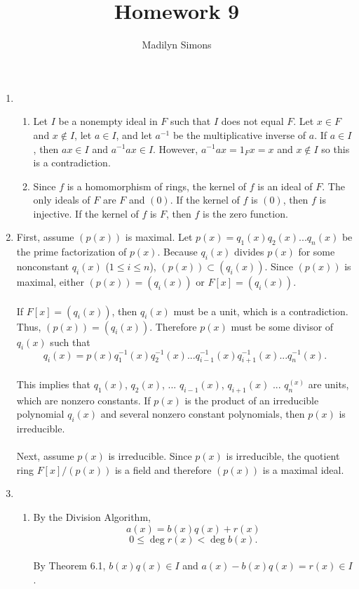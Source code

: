 \documentclass{article}
\title{Homework 9}
\author{Madilyn Simons}
\date{}
\begin{document}
\maketitle

\begin{enumerate}

\item
\begin{enumerate}

\item Let $I$ be a nonempty ideal in $F$ such that $I$ does not equal $F$.
Let $x \in F$ and $x \notin I$, let $a \in I$, and let $a^{-1}$ be the
multiplicative inverse of $a$.  If $a \in I$, then $ax \in I$ and
$a^{-1}ax \in I$.  However, $a^{-1}ax = 1_{F}x = x$ and $x \notin I$ so this
is a contradiction.

\item Since $f$ is a homomorphism of rings, the kernel of $f$ is an ideal
of $F$.  The only ideals of $F$ are $F$ and $(0)$.  If the kernel of
$f$ is $(0)$, then $f$ is injective.  If the kernel of $f$ is $F$, then
$f$ is the zero function.

\end{enumerate}

\item
First, assume $(p(x))$ is maximal.  Let
$p(x) = q_{1}(x)q_{2}(x) ... q_{n}(x)$ be the prime factorization of $p(x)$.
Because $q_{i}(x)$ divides $p(x)$ for some nonconstant $q_{i}(x)$ ($1 \leq i \leq n$),
 $(p(x)) \subset (q_{i}(x))$.
Since $(p(x))$ is maximal, either $(p(x)) = (q_{i}(x))$ or $F[x] = (q_{i}(x))$.
\\ \\
If $F[x] = (q_{i}(x))$, then $q_{i}(x)$ must
be a unit, which is a contradiction.  Thus, $(p(x)) = (q_{i}(x))$.
Therefore $p(x)$ must be some divisor of
$q_{i}(x)$ such that
\[
q_{i}(x) = p(x)q_{1}^{-1}(x)q_{2}^{-1}(x) ... q_{i-1}^{-1}(x)q_{i+1}^{-1}(x) ... q_{n}^{-1}(x).
\]
\\
This
implies that $q_{1}(x)$, $q_{2}(x)$, ... $q_{i-1}(x)$, $q_{i+1}(x)$ ... $q_{n}^(x)$
are units, which are nonzero constants.  If $p(x)$ is the product of an
irreducible polynomial $q_{i}(x)$
and several nonzero constant polynomials, then $p(x)$ is irreducible.
\\ \\
Next, assume $p(x)$ is irreducible.  Since $p(x)$ is irreducible, the quotient
ring $F[x]/(p(x))$ is a field and therefore $(p(x))$ is a maximal ideal.

\item
\begin{enumerate}
\item
By the Division Algorithm,
\[
a(x) = b(x)q(x) + r(x)
\] \[
0 \leq \deg{r(x)} < \deg{b(x)}.
\]
\\
By Theorem 6.1, $b(x)q(x) \in I$ and
$a(x) - b(x)q(x) = r(x) \in I$.


\end{enumerate}
\end{enumerate}
\end{document}

